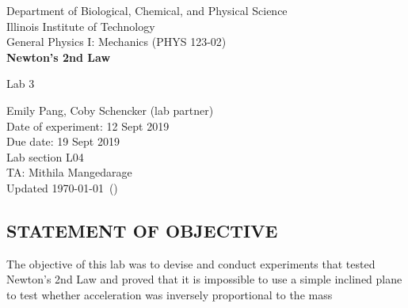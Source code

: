 \documentclass [12pt, letterpaper, twoside] {article}
\begin{document}
\begin {titlepage}
\begin {center}
Department of Biological, Chemical, and Physical Science\\
\vspace {0.1cm}
Illinois Institute of Technology\\
\vspace {0.1cm}
General Physics I: Mechanics (PHYS 123-02)\\
\vspace* {\fill}
\begingroup
\Large
\textbf {Newton's 2nd Law}
\vspace {0.35cm}

\normalsize
Lab 3
\vspace {1.5cm}
\endgroup
\vspace* {\fill}
\end {center}

\vspace*{\fill}
\begin {flushright}
\footnotesize
Emily Pang, Coby Schencker (lab partner)\\
Date of experiment: 12 Sept 2019\\
Due date: 19 Sept 2019\\
Lab section L04\\
TA: Mithila Mangedarage\\
Updated \usdate\today~(\currenttime)
\end {flushright}
\end {titlepage}
\pgfplotsset{compat=1.7}
\subsection* {STATEMENT OF OBJECTIVE}
The objective of this lab was to devise and conduct experiments that tested Newton's 2nd Law and proved that it is impossible to use a simple inclined plane to test whether acceleration was inversely proportional to the mass
\end{document}
